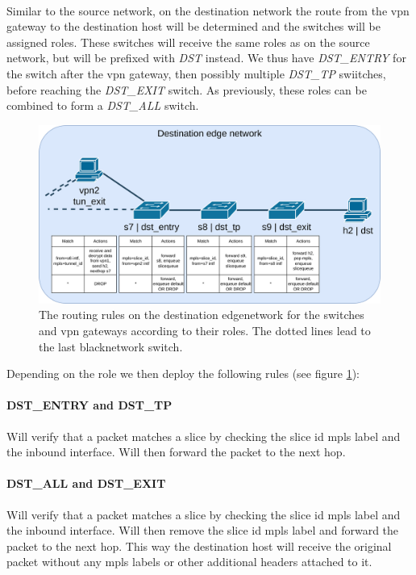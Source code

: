 \paragraph{} Similar to the source network, on the destination network the route from the \acrshort{vpn} gateway to the destination host will be determined and the switches will be assigned roles. These switches will receive the same roles as on the source network, but will be prefixed with \textit{DST} instead. We thus have \textit{DST\_ENTRY} for the switch after the \acrshort{vpn} gateway, then possibly multiple \textit{DST\_TP} swiitches, before reaching the \textit{DST\_EXIT} switch. As previously, these roles can be combined to form a \textit{DST\_ALL} switch.

\begin{figure}[ht]
    \centering
    \includegraphics[width=\linewidth]{images/chapter_6/routing_destination.png}
    \caption[Routing on the destination \gls{edgenetwork}]{The routing rules on the destination \gls{edgenetwork} for the switches and \acrshort{vpn} gateways according to their roles. The dotted lines lead to the last \gls{blacknetwork} switch.}
    \label{fig:routing_destination}
\end{figure}

Depending on the role we then deploy the following rules (see figure \ref{fig:routing_destination}):

\paragraph{DST\_ENTRY and DST\_TP} Will verify that a packet matches a slice by checking the slice id \acrshort{mpls} label and the inbound interface. Will then forward the packet to the next hop.

\paragraph{DST\_ALL and DST\_EXIT} Will verify that a packet matches a slice by checking the slice id \acrshort{mpls} label and the inbound interface. Will then remove the slice id \acrshort{mpls} label and forward the packet to the next hop. This way the destination host will receive the original packet without any \acrshort{mpls} labels or other additional headers attached to it.


